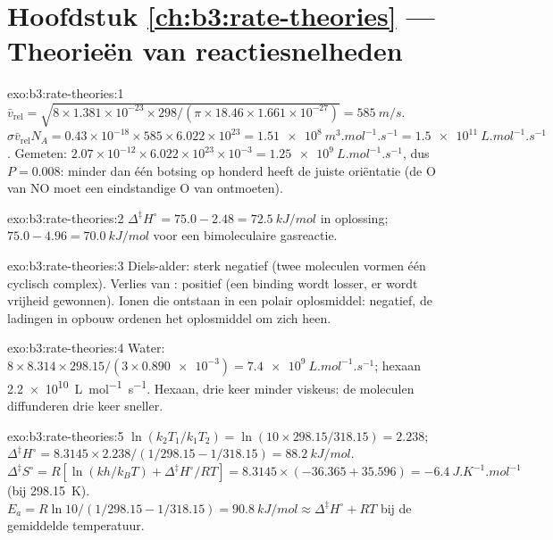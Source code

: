 \section*{Hoofdstuk \ref{ch:b3:rate-theories} --- Theorieën van reactiesnelheden}

\begin{solution}{exo:b3:rate-theories:1}
$\bar v_{\mathrm{rel}} = \sqrt{8 \times 1.381\times10^{-23} \times 298/(\pi \times 18.46 \times 1.661\times10^{-27})} = \qty{585}{m/s}$.
$\sigma\bar v_{\mathrm{rel}}N_A = 0.43\times10^{-18} \times 585 \times 6.022\times10^{23} = \qty{1.51e8}{m^3.mol^{-1}.s^{-1}} =
\qty{1.5e11}{L.mol^{-1}.s^{-1}}$. Gemeten: $2.07\times10^{-12} \times 6.022\times10^{23}\times10^{-3} =
\qty{1.25e9}{L.mol^{-1}.s^{-1}}$, dus $P = 0.008$: minder dan één botsing
op honderd heeft de juiste oriëntatie (de O van NO moet een eindstandige O
van  ontmoeten).
\end{solution}

\begin{solution}{exo:b3:rate-theories:2}
$\Delta^{\ddagger}H^\circ = 75.0 - 2.48 = \qty{72.5}{kJ/mol}$ in oplossing; $75.0 - 4.96 = \qty{70.0}{kJ/mol}$
voor een bimoleculaire gasreactie.
\end{solution}

\begin{solution}{exo:b3:rate-theories:3}
Diels-alder: sterk negatief (twee moleculen vormen één cyclisch complex).
Verlies van : positief (een binding wordt losser, er wordt vrijheid
gewonnen). Ionen die ontstaan in een polair oplosmiddel: negatief, de
ladingen in opbouw ordenen het oplosmiddel om zich heen.
\end{solution}

\begin{solution}{exo:b3:rate-theories:4}
Water: $8 \times 8.314 \times 298.15/(3 \times \num{0.890e-3}) = \qty{7.4e9}{L.mol^{-1}.s^{-1}}$; hexaan
\qty{2.2e10}{L.mol^{-1}.s^{-1}}. Hexaan, drie keer minder viskeus: de
moleculen diffunderen drie keer sneller.
\end{solution}

\begin{solution}{exo:b3:rate-theories:5}
$\ln(k_2T_1/k_1T_2) = \ln(10 \times 298.15/318.15) = 2.238$; $\Delta^{\ddagger}H^\circ = 8.3145 \times 2.238/(1/298.15 -
1/318.15) = \qty{88.2}{kJ/mol}$. $\Delta^{\ddagger}S^\circ = R[\ln(kh/k_BT) + \Delta^{\ddagger}H^\circ/RT] = 8.3145 \times
(-36.365 + 35.596) = \qty{-6.4}{J.K^{-1}.mol^{-1}}$ (bij \qty{298.15}{K}). $E_a = R\ln10/(1/298.15 - 1/318.15) =
\qty{90.8}{kJ/mol} \approx \Delta^{\ddagger}H^\circ + RT$ bij de gemiddelde temperatuur.
\end{solution}

